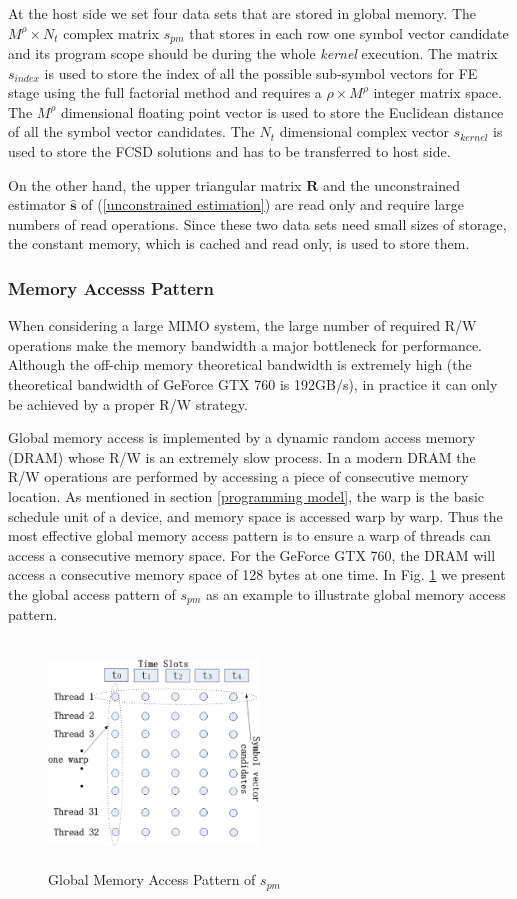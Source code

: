 \documentclass[letterpaper, 10pt, conference,twoside]{ieeeconf}
\begin{document}
At the host side we set four data sets that are stored in global memory. The $M^{\rho}\times N_{t}$ complex matrix $\mathit{s_{pm}}$ that stores in each row one symbol vector candidate and its program scope should be during the whole \textit{kernel} execution. The matrix $\mathit{s_{index}}$ is used to store the index of all the possible sub-symbol vectors for  FE stage using the full factorial method and requires a $\rho\times M^{\rho}$  integer matrix space. The $M^{\rho}$ dimensional floating point vector is used to store the Euclidean distance of all the symbol vector candidates. The $N_{t}$ dimensional complex vector $\mathit{s_{kernel}}$ is used to store the FCSD solutions and has to be transferred to host side.

On the other hand, the upper triangular matrix $\mathbf{R}$ and the unconstrained estimator $\mathbf{\hat{s}}$ of (\ref{unconstrained estimation}) are read only and require large numbers of read operations. Since these two data sets need small sizes of storage, the constant memory, which is cached and read only, is used to store them.
\subsubsection{Memory Accesss Pattern}
When considering a large MIMO system, the large number of required R/W operations make the memory bandwidth a major bottleneck for performance. Although the off-chip memory theoretical bandwidth is extremely high (the theoretical bandwidth of GeForce GTX 760 is 192GB/s), in practice it can only be achieved by a proper R/W strategy.

Global memory access is implemented by a dynamic random access memory (DRAM) whose R/W is an extremely slow process. In a modern DRAM the R/W operations are performed by accessing a piece of consecutive memory location. As mentioned in section \ref{programming model}, the warp is the basic schedule unit of a device, and memory space is accessed warp by warp. Thus the most effective global memory access pattern is to ensure a warp of threads can access a consecutive memory space. For the GeForce GTX 760, the DRAM will access a consecutive memory space of 128 bytes at one time. In Fig. \ref{coalesce global memory} we present the global access pattern of $\mathit{s_{pm}}$ as an example to illustrate global memory access pattern.
\begin{figure}[htb]
\centering
\includegraphics[width=0.5\textwidth, height=6cm]{coalescing_global_memory.eps}
\caption{Global Memory Access Pattern of $\mathit{s_{pm}}$}
\label{coalesce global memory}
\end{figure}
\end{document}
